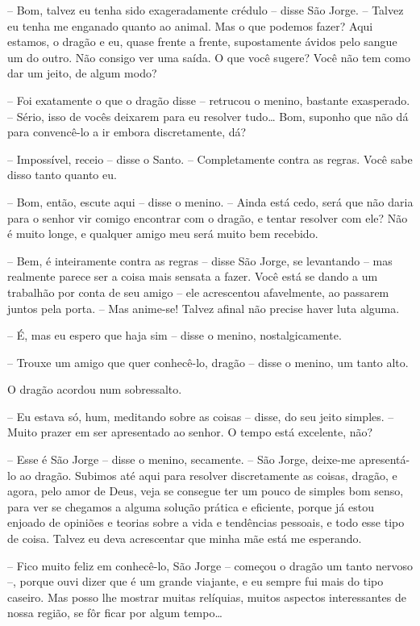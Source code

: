 -- Bom, talvez eu tenha sido exageradamente crédulo -- disse São Jorge.
-- Talvez eu tenha me enganado quanto ao animal. Mas o que podemos
fazer? Aqui estamos, o dragão e eu, quase frente a frente,
supostamente ávidos pelo sangue um do outro. Não consigo ver uma
saída. O que você sugere? Você não tem como dar um jeito, de algum
modo?

-- Foi exatamente o que o dragão disse -- retrucou o menino, bastante
exasperado. -- Sério, isso de vocês deixarem para eu resolver tudo…
Bom, suponho que não dá para convencê-lo a ir embora discretamente,
dá?

-- Impossível, receio -- disse o Santo. -- Completamente contra as
regras. Você sabe disso tanto quanto eu. 

-- Bom, então, escute aqui -- disse o menino. -- Ainda está cedo, será
que não daria para o senhor vir comigo encontrar com o dragão, e
tentar resolver com ele? Não é muito longe, e qualquer amigo meu será
muito bem recebido. 

-- Bem, é inteiramente contra as regras -- disse São Jorge, se
levantando -- mas realmente parece ser a coisa mais sensata a fazer.
Você está se dando a um trabalhão por conta de seu amigo -- ele
acrescentou afavelmente, ao passarem juntos pela porta. -- Mas
anime-se! Talvez afinal não precise haver luta alguma.

-- É, mas eu espero que haja sim -- disse o menino, nostalgicamente. 

-- Trouxe um amigo que quer conhecê-lo, dragão -- disse o menino, um
tanto alto.

O dragão acordou num sobressalto.

-- Eu estava só, hum, meditando sobre as coisas -- disse, do seu jeito
simples. -- Muito prazer em ser apresentado ao senhor. O tempo está
excelente, não?

-- Esse é São Jorge -- disse o menino, secamente. -- São Jorge, deixe-me
apresentá-lo ao dragão. Subimos até aqui para resolver discretamente
as coisas, dragão, e agora, pelo amor de Deus, veja se consegue ter
um pouco de simples bom senso, para ver se chegamos a alguma solução
prática e eficiente, porque já estou enjoado de opiniões e teorias
sobre a vida e tendências pessoais, e todo esse tipo de coisa. Talvez
eu deva acrescentar que minha mãe está me esperando.

-- Fico muito feliz em conhecê-lo, São Jorge -- começou o dragão um
tanto nervoso --, porque ouvi dizer que é um grande viajante, e eu
sempre fui mais do tipo caseiro. Mas posso lhe mostrar muitas
relíquias, muitos aspectos interessantes de nossa região, se fôr
ficar por algum tempo…

